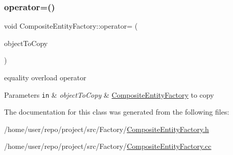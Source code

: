 \subsubsection{\texorpdfstring{operator=()}{operator=()}}
{\footnotesize\ttfamily void Composite\+Entity\+Factory\+::operator= (\begin{DoxyParamCaption}\item[{const \hyperlink{classCompositeEntityFactory}{Composite\+Entity\+Factory} \&}]{object\+To\+Copy }\end{DoxyParamCaption})}



equality overload operator 


\begin{DoxyParams}[1]{Parameters}
\mbox{\tt in}  & {\em object\+To\+Copy} & \hyperlink{classCompositeEntityFactory}{Composite\+Entity\+Factory} to copy \\
\hline
\end{DoxyParams}


The documentation for this class was generated from the following files\+:\begin{DoxyCompactItemize}
\item 
/home/user/repo/project/src/\+Factory/\hyperlink{CompositeEntityFactory_8h}{Composite\+Entity\+Factory.\+h}\item 
/home/user/repo/project/src/\+Factory/\hyperlink{CompositeEntityFactory_8cc}{Composite\+Entity\+Factory.\+cc}\end{DoxyCompactItemize}
